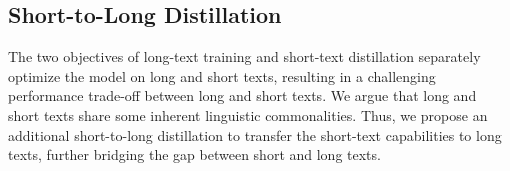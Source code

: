 \subsection{Short-to-Long Distillation}
\label{sec:s2l_distillation}


The two objectives of long-text training and short-text distillation separately optimize the model on long and short texts, resulting in a challenging performance trade-off between long and short texts. We argue that long and short texts share some inherent linguistic commonalities. Thus, we propose an additional short-to-long distillation to transfer the short-text capabilities to long texts, further bridging the gap between short and long texts.


